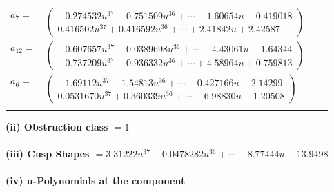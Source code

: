 \documentclass[1p]{elsarticle_modified}
\theoremstyle{definition}
\begin{document}
\begin{tabular}{m{7pt} m{180pt} m{7pt} m{180pt} }
\flushright $a_{7}=$&$\begin{pmatrix}-0.274532 u^{37}-0.751509 u^{36}+\cdots-1.60654 u-0.419018\\0.416502 u^{37}+0.416592 u^{36}+\cdots+2.41842 u+2.42587\end{pmatrix}$ \\
\flushright $a_{12}=$&$\begin{pmatrix}-0.607657 u^{37}-0.0389698 u^{36}+\cdots-4.43061 u-1.64344\\-0.737209 u^{37}-0.936332 u^{36}+\cdots+4.58964 u+0.759813\end{pmatrix}$ \\
\flushright $a_{6}=$&$\begin{pmatrix}-1.69112 u^{37}-1.54813 u^{36}+\cdots-0.427166 u-2.14299\\0.0531670 u^{37}+0.360339 u^{36}+\cdots-6.98830 u-1.20508\end{pmatrix}$\\&\end{tabular}
\flushleft \textbf{(ii) Obstruction class $= 1$}\\~\\
\flushleft \textbf{(iii) Cusp Shapes $= 3.31222 u^{37}-0.0478282 u^{36}+\cdots-8.77444 u-13.9498$}\\~\\
\newpage\renewcommand{\arraystretch}{1}
\flushleft \textbf{(iv) u-Polynomials at the component}\newline \\
\end{document}
